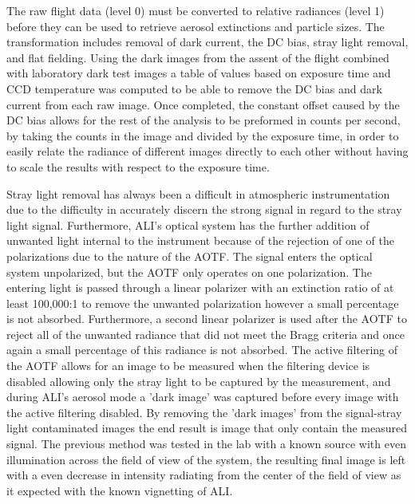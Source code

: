 \documentclass[12pt]{article}
\begin{document}
The raw flight data (level 0) must be converted to relative radiances (level 1) before they can be used to retrieve aerosol extinctions and particle sizes. The transformation includes removal of dark current, the DC bias, stray light removal, and flat fielding. Using the dark images from the assent of the flight combined with laboratory dark test images a table of values based on exposure time and CCD temperature was computed to be able to remove the DC bias and dark current from each raw image. Once completed, the constant offset caused by the DC bias allows for the rest of the analysis to be preformed in counts per second, by taking the counts in the image and divided by the exposure time, in order to easily relate the radiance of different images directly to each other without having to scale the results with respect to the exposure time.

Stray light removal has always been a difficult in atmospheric instrumentation due to the difficulty in accurately discern the strong signal in regard to the stray light signal. Furthermore, ALI's optical system has the further addition of unwanted light internal to the instrument because of the rejection of one of the polarizations due to the nature of the AOTF. The signal enters the optical system unpolarized, but the AOTF only operates on one polarization. The entering light is passed through a linear polarizer with an extinction ratio of at least 100,000:1 to remove the unwanted polarization however a small percentage is not absorbed. Furthermore, a second linear polarizer is used after the AOTF to reject all of the unwanted radiance that did not meet the Bragg criteria and once again a small percentage of this radiance is not absorbed. The active filtering of the AOTF allows for an image to be measured when the filtering device is disabled allowing only the stray light to be captured by the measurement, and during ALI's aerosol mode a 'dark image' was captured before every image with the active filtering disabled. By removing the 'dark images' from the signal-stray light contaminated images the end result is image that only contain the measured signal. The previous method was tested in the lab with a known source with even illumination across the field of view of the system, the resulting final image is left with a even decrease in intensity radiating from the center of the field of view as it expected with the known vignetting of ALI.
\end{document}

